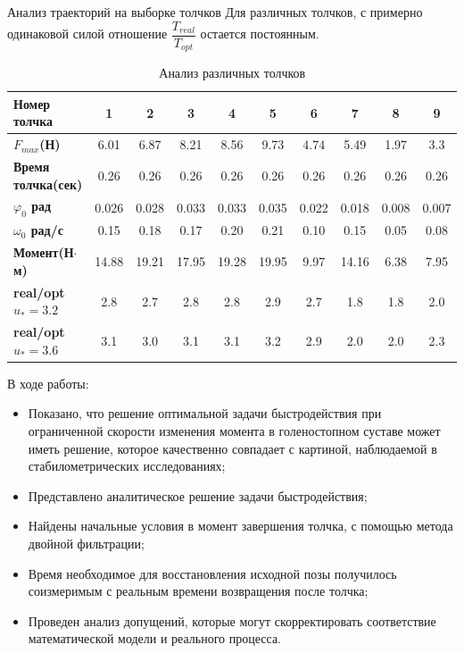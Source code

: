\documentclass[10pt]{beamer}
\begin{document}
\begin{frame}[shrink=21]{Анализ траекторий на выборке толчков}
	Для различных толчков, с примерно одинаковой силой отношение $\dfrac{T_{real}}{T_{opt}}$ остается постоянным.
	\begin{table}[h!]
		\centering
		\begin{tabular}{|l|c|c|c|c|c|c|c|c|c|}
			\hline
			\textbf{Номер толчка}       & \textbf{1} & \textbf{2} & \textbf{3} & \textbf{4} & \textbf{5} & \textbf{6} & \textbf{7} & \textbf{8} & \textbf{9} \\ \hline
			\textbf{$F_{max}$(Н)}       & 6.01       & 6.87       & 8.21       & 8.56       & 9.73       & 4.74       & 5.49       & 1.97       & 3.3        \\ \hline
			\textbf{Время толчка(сек)}  & 0.26       & 0.26       & 0.26       & 0.26       & 0.26       & 0.26       & 0.26       & 0.26       & 0.26       \\ \hline
			\textbf{$\varphi_0$ рад}    & 0.026      & 0.028      & 0.033      & 0.033      & 0.035      & 0.022      & 0.018      & 0.008      & 0.007      \\ \hline
			\textbf{$\omega_0$ рад/с}   & 0.15       & 0.18       & 0.17       & 0.20       & 0.21       & 0.10       & 0.15       & 0.05       & 0.08       \\ \hline
			\textbf{Момент(Н$\cdot$м)}  & 14.88      & 19.21      & 17.95      & 19.28      & 19.95      & 9.97       & 14.16      & 6.38       & 7.95       \\ \hline
			\textbf{real/opt $u_*=3.2$} & 2.8        & 2.7        & 2.8        & 2.8        & 2.9        & 2.7        & 1.8        & 1.8        & 2.0        \\ \hline
			\textbf{real/opt $u_*=3.6$} & 3.1        & 3.0        & 3.1        & 3.1        & 3.2        & 2.9        & 2.0        & 2.0        & 2.3        \\ \hline
		\end{tabular}
		\caption{Анализ различных толчков}
		\label{final_table}
	\end{table}
\end{frame}
\begin{frame}
	В ходе работы:
	\begin{itemize}
		\item Показано, что решение оптимальной задачи быстродействия при ограниченной
		      скорости изменения момента в голеностопном суставе может иметь решение, которое качественно совпадает с картиной, наблюдаемой в стабилометрических исследованиях;
		\item Представлено аналитическое решение задачи быстродействия;
		\item Найдены начальные условия в момент завершения толчка, с помощью метода двойной фильтрации;
		\item Время необходимое для восстановления исходной позы получилось
		      соизмеримым с реальным времени возвращения после толчка;
		\item Проведен анализ допущений, которые могут скорректировать соответствие математической модели и реального процесса.
	\end{itemize}
\end{frame}
\begin{frame}
\end{frame}
\end{document}

